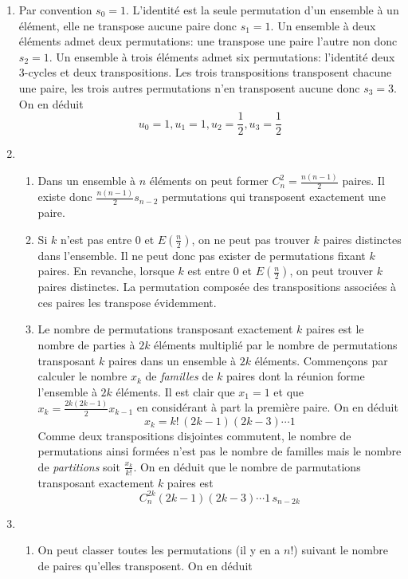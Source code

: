 \begin{enumerate}
\item Par convention $s_0=1$. L'identité est la seule permutation d'un
  ensemble  à un élément, elle ne transpose aucune paire donc
  $s_1=1$. Un ensemble à deux éléments admet deux permutations: une
  transpose une paire l'autre non donc $s_2=1$. Un ensemble  à trois
  éléments admet six permutations: l'identité deux 3-cycles et deux
  transpositions. Les trois transpositions transposent chacune une
  paire, les trois autres permutations n'en transposent aucune donc
  $s_3=3$. On en déduit
\[u_0=1,u_1=1,u_2=\frac{1}{2},u_3=\frac{1}{2}\]
\item 
  \begin{enumerate}
  \item Dans un ensemble à $n$ éléments on peut former
    $C_n^2=\frac{n(n-1)}{2}$ paires. Il existe donc
    $\frac{n(n-1)}{2}s_{n-2}$ permutations qui transposent exactement
    une paire.
  \item Si $k$ n'est pas entre 0 et $E(\frac{n}{2})$, on ne peut pas
    trouver $k$ paires distinctes dans l'ensemble. Il ne peut donc pas
    exister de permutations fixant $k$ paires. En revanche, lorsque
    $k$ est entre 0 et $E(\frac{n}{2})$, on peut trouver $k$ paires
    distinctes. La permutation composée des transpositions associées à
    ces paires les transpose évidemment.
  \item  Le nombre de permutations transposant exactement $k$ paires
    est le nombre de parties à $2k$ éléments multiplié par le nombre
    de permutations transposant $k$ paires dans un ensemble à $2k$
    éléments.\newline
Commençons par calculer le nombre $x_k$ de \emph{familles} de $k$ paires
dont la réunion forme l'ensemble à $2k$ éléments. Il est clair que
$x_1=1$ et que $x_k=\frac{2k(2k-1)}{2}x_{k-1}$ en considérant à part la
première paire. On en déduit
\[x_k=k!\,(2k-1)(2k-3)\cdots 1\]
Comme deux transpositions disjointes commutent, le nombre de
permutations ainsi formées n'est pas le nombre de familles mais le
nombre de \emph{partitions} soit $\frac{x_k}{k!}$. On en déduit que le
nombre de parmutations transposant exactement $k$ paires est 
\[C_n^{2k}(2k-1)(2k-3)\cdots 1\,s_{n-2k}\]
  \end{enumerate}
\item 
  \begin{enumerate}
  \item On peut classer toutes les permutations (il y en a $n!$)
    suivant le nombre de paires qu'elles transposent. On en déduit

\end{enumerate}
\end{enumerate}
